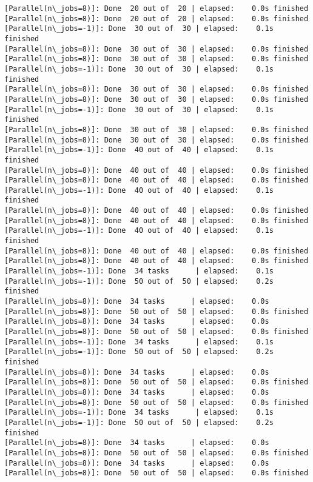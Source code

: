 \documentclass[11pt]{article}
\begin{document}
\begin{Verbatim}[commandchars=\\\{\}]
[Parallel(n\_jobs=8)]: Done  20 out of  20 | elapsed:    0.0s finished
[Parallel(n\_jobs=8)]: Done  20 out of  20 | elapsed:    0.0s finished
[Parallel(n\_jobs=-1)]: Done  30 out of  30 | elapsed:    0.1s finished
[Parallel(n\_jobs=8)]: Done  30 out of  30 | elapsed:    0.0s finished
[Parallel(n\_jobs=8)]: Done  30 out of  30 | elapsed:    0.0s finished
[Parallel(n\_jobs=-1)]: Done  30 out of  30 | elapsed:    0.1s finished
[Parallel(n\_jobs=8)]: Done  30 out of  30 | elapsed:    0.0s finished
[Parallel(n\_jobs=8)]: Done  30 out of  30 | elapsed:    0.0s finished
[Parallel(n\_jobs=-1)]: Done  30 out of  30 | elapsed:    0.1s finished
[Parallel(n\_jobs=8)]: Done  30 out of  30 | elapsed:    0.0s finished
[Parallel(n\_jobs=8)]: Done  30 out of  30 | elapsed:    0.0s finished
[Parallel(n\_jobs=-1)]: Done  40 out of  40 | elapsed:    0.1s finished
[Parallel(n\_jobs=8)]: Done  40 out of  40 | elapsed:    0.0s finished
[Parallel(n\_jobs=8)]: Done  40 out of  40 | elapsed:    0.0s finished
[Parallel(n\_jobs=-1)]: Done  40 out of  40 | elapsed:    0.1s finished
[Parallel(n\_jobs=8)]: Done  40 out of  40 | elapsed:    0.0s finished
[Parallel(n\_jobs=8)]: Done  40 out of  40 | elapsed:    0.0s finished
[Parallel(n\_jobs=-1)]: Done  40 out of  40 | elapsed:    0.1s finished
[Parallel(n\_jobs=8)]: Done  40 out of  40 | elapsed:    0.0s finished
[Parallel(n\_jobs=8)]: Done  40 out of  40 | elapsed:    0.0s finished
[Parallel(n\_jobs=-1)]: Done  34 tasks      | elapsed:    0.1s
[Parallel(n\_jobs=-1)]: Done  50 out of  50 | elapsed:    0.2s finished
[Parallel(n\_jobs=8)]: Done  34 tasks      | elapsed:    0.0s
[Parallel(n\_jobs=8)]: Done  50 out of  50 | elapsed:    0.0s finished
[Parallel(n\_jobs=8)]: Done  34 tasks      | elapsed:    0.0s
[Parallel(n\_jobs=8)]: Done  50 out of  50 | elapsed:    0.0s finished
[Parallel(n\_jobs=-1)]: Done  34 tasks      | elapsed:    0.1s
[Parallel(n\_jobs=-1)]: Done  50 out of  50 | elapsed:    0.2s finished
[Parallel(n\_jobs=8)]: Done  34 tasks      | elapsed:    0.0s
[Parallel(n\_jobs=8)]: Done  50 out of  50 | elapsed:    0.0s finished
[Parallel(n\_jobs=8)]: Done  34 tasks      | elapsed:    0.0s
[Parallel(n\_jobs=8)]: Done  50 out of  50 | elapsed:    0.0s finished
[Parallel(n\_jobs=-1)]: Done  34 tasks      | elapsed:    0.1s
[Parallel(n\_jobs=-1)]: Done  50 out of  50 | elapsed:    0.2s finished
[Parallel(n\_jobs=8)]: Done  34 tasks      | elapsed:    0.0s
[Parallel(n\_jobs=8)]: Done  50 out of  50 | elapsed:    0.0s finished
[Parallel(n\_jobs=8)]: Done  34 tasks      | elapsed:    0.0s
[Parallel(n\_jobs=8)]: Done  50 out of  50 | elapsed:    0.0s finished

\end{Verbatim}
\end{document}
